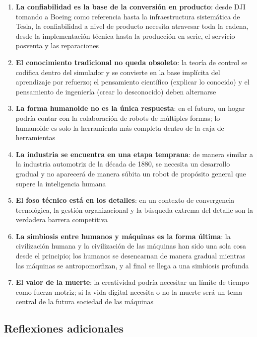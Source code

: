 \documentclass[a4paper]{article}
\begin{document}
\begin{enumerate}
    \item \textbf{La confiabilidad es la base de la conversión en producto}: desde DJI tomando a Boeing como referencia hasta la infraestructura sistemática de Tesla, la confiabilidad a nivel de producto necesita atravesar toda la cadena, desde la implementación técnica hasta la producción en serie, el servicio posventa y las reparaciones
    \item \textbf{El conocimiento tradicional no queda obsoleto}: la teoría de control se codifica dentro del simulador y se convierte en la base implícita del aprendizaje por refuerzo; el pensamiento científico (explicar lo conocido) y el pensamiento de ingeniería (crear lo desconocido) deben alternarse
    \item \textbf{La forma humanoide no es la única respuesta}: en el futuro, un hogar podría contar con la colaboración de robots de múltiples formas; lo humanoide es solo la herramienta más completa dentro de la caja de herramientas
    \item \textbf{La industria se encuentra en una etapa temprana}: de manera similar a la industria automotriz de la década de 1880, se necesita un desarrollo gradual y no aparecerá de manera súbita un robot de propósito general que supere la inteligencia humana
    \item \textbf{El foso técnico está en los detalles}: en un contexto de convergencia tecnológica, la gestión organizacional y la búsqueda extrema del detalle son la verdadera barrera competitiva
    \item \textbf{La simbiosis entre humanos y máquinas es la forma última}: la civilización humana y la civilización de las máquinas han sido una sola cosa desde el principio; los humanos se desencarnan de manera gradual mientras las máquinas se antropomorfizan, y al final se llega a una simbiosis profunda
    \item \textbf{El valor de la muerte}: la creatividad podría necesitar un límite de tiempo como fuerza motriz; si la vida digital necesita o no la muerte será un tema central de la futura sociedad de las máquinas
\end{enumerate}

\subsection{Reflexiones adicionales}
\end{document}
